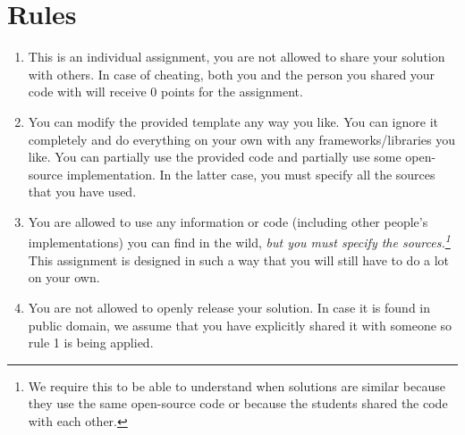 \documentclass[letterpaper,12pt]{article}
\begin{document}
\section{Rules}
\begin{enumerate}
    \item This is an individual assignment, you are not allowed to share your solution with others. In case of cheating, both you and the person you shared your code with will receive 0 points for the assignment. 
    \item You can modify the provided template any way you like. You can ignore it completely and do everything on your own with any frameworks/libraries you like. You can partially use the provided code and partially use some open-source implementation. In the latter case, you must specify all the sources that you have used.
    \item You are allowed to use any information or code (including other people's implementations) you can find in the wild, \textit{but you must specify the sources.\footnote{We require this to be able to understand when solutions are similar because they use the same open-source code or because the students shared the code with each other.}} This assignment is designed in such a way that you will still have to do a lot on your own.
    \item You are not allowed to openly release your solution. In case it is found in public domain, we assume that you have explicitly shared it with someone so rule 1 is being applied.
\end{enumerate}


\end{document}
